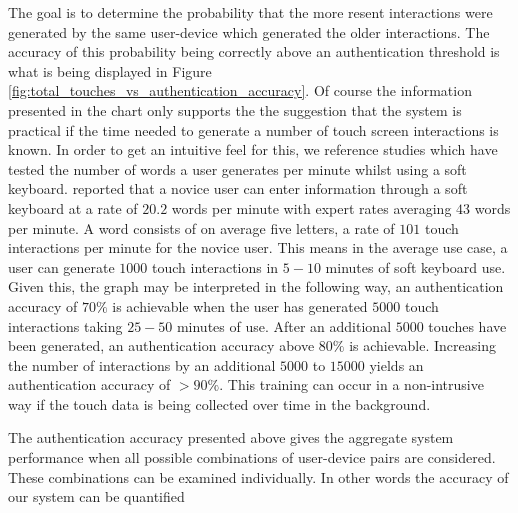 %
%
The goal is to determine the probability that
the more resent interactions
were generated by the same user-device which
generated the older interactions.
%
The accuracy of this probability
being correctly above an authentication threshold 
is what is being displayed in 
Figure 
\ref{fig:total_touches_vs_authentication_accuracy}.
%
Of course
the information presented in the chart 
only supports the
the suggestion that the system is practical 
if the time needed to generate a number of
touch screen interactions is known.
%
In order to get an intuitive feel for this,
we reference studies which have tested
the number of words a user generates per minute
whilst using a soft keyboard.
%
\cite{mackenzie1999text} reported that a
novice user can enter information through 
a soft keyboard at a rate of $20.2$ words per minute with
expert rates averaging $43$ words per minute.
%
A word consists of on average five letters, 
a rate of $101$ touch interactions per minute for the novice user.
%
This means in the average use case, 
a user can generate $1000$ touch interactions in $5-10$ minutes of 
soft keyboard use.
%
Given this,
the graph may be interpreted in the following way,
an authentication accuracy of $70\%$ is achievable 
when the user has generated $5000$ touch interactions
taking $25-50$ minutes of use.
%
After an additional $5000$ touches have been generated,
an authentication accuracy above $80\%$ is achievable.
Increasing the number of interactions 
by an additional $5000$ to $15000$ yields
an authentication accuracy of $>90\%$.
%
This training can occur in a non-intrusive way
if the touch data is being collected over time in the background.


The authentication accuracy presented above gives 
the aggregate system performance when all
possible combinations of user-device pairs are considered.
These combinations can be examined individually.
%
In other words the accuracy of our system can be quantified

